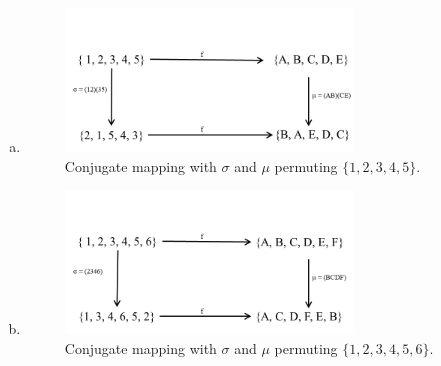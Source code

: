 \begin{enumerate}[(a)]
\item
\begin{figure}[H]
\begin{center}
\includegraphics[width=3in]{images/Conj1a.png}
\caption{Conjugate mapping with $\sigma$ and $\mu$ permuting $\{1,2,3,4,5\}$.}
\end{center}
\end{figure}

\item
\begin{figure}[H]
\begin{center}
\includegraphics[width=3in]{images/Conj1b.png}
\caption{Conjugate mapping with $\sigma$ and $\mu$ permuting $\{1,2,3,4,5,6\}$.}
\end{center}
\end{figure}
\end{enumerate}

